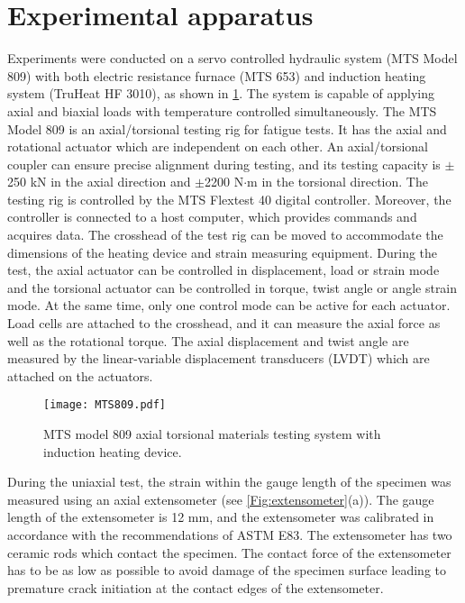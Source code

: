 \section{Experimental apparatus}
\noindent
Experiments were conducted on a servo controlled hydraulic system (MTS Model 809) with both electric resistance furnace (MTS 653) and induction heating system (TruHeat HF 3010), as shown in \ref{Fig:MTS809}.
The system is capable of applying axial and biaxial loads with temperature controlled simultaneously.
The MTS Model 809 is an axial/torsional testing rig for fatigue tests. It has the axial and rotational actuator which are independent on each other.
An axial/torsional coupler can ensure precise alignment during testing, and its testing capacity is $\pm$250 kN in the axial direction and $\pm$2200 N$\cdot$m in the torsional direction.
The testing rig is controlled by the MTS Flextest 40 digital controller. Moreover, the controller is connected to a host computer, which provides commands and acquires data.
The crosshead of the test rig can be moved to accommodate the dimensions of the heating device and strain measuring equipment.
During the test, the axial actuator can be controlled in displacement, load or strain mode and the torsional actuator can be controlled in torque, twist angle or angle strain mode.
At the same time, only one control mode can be active for each actuator.
Load cells are attached to the crosshead, and it can measure the axial force as well as the rotational torque.
The axial displacement and twist angle are measured by the linear-variable displacement transducers (LVDT) which are attached on the actuators.

\begin{figure}[!htp]
  \centering
  \texttt{[image: MTS809.pdf]}
\caption{MTS model 809 axial torsional materials testing system with induction heating device.}
\label{Fig:MTS809}
\end{figure}

During the uniaxial test, the strain within the gauge length of the specimen was measured using an axial extensometer (see \ref{Fig:extensometer}(a)).
The gauge length of the extensometer is 12 mm, and the extensometer was calibrated in accordance with the recommendations of ASTM E83.
The extensometer has two ceramic rods which contact the specimen.
The contact force of the extensometer has to be as low as possible to avoid damage of the specimen surface leading to premature crack initiation at the contact edges of the extensometer.

